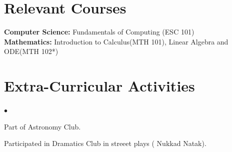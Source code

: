 \documentclass[margin,line]{res}
\newenvironment{list2}{
  \begin{list}{$\bullet$}{%
      \setlength{\itemsep}{0in}
      \setlength{\parsep}{0in} \setlength{\parskip}{0in}
      \setlength{\topsep}{0in} \setlength{\partopsep}{0in}
      \setlength{\leftmargin}{0.2in}}}{\end{list}}
\begin{document}
\begin{resume}
\section{\sc \large Relevant Courses}
{\bf Computer Science:} Fundamentals  of Computing (ESC 101)\\
{\bf Mathematics:} Introduction to Calculus(MTH 101), Linear Algebra and ODE(MTH 102*)



\section{\sc \large Extra-Curricular Activities}

\begin{list2}
\item  Part of Astronomy Club.
\item  Participated in Dramatics Club in streeet plays ( Nukkad Natak).
\end{list2}


\end{resume}
\end{document}
